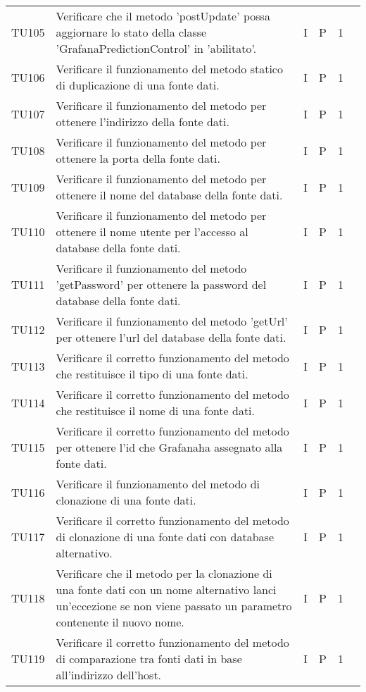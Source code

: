 \begin{longtable} {
		>{}p{12mm}
		>{}p{79.5mm}
		>{}p{9mm}
		>{}p{8mm}
		>{}p{14mm}
		>{}p{0mm}}
	TU105		& Verificare che il metodo 'postUpdate' possa aggiornare lo stato della classe 'GrafanaPredictionControl' in 'abilitato'.& I & P & 1 &\TBstrut \\ [2mm]
	TU106		& Verificare il funzionamento del metodo statico di duplicazione di una fonte dati.& I & P & 1 &\TBstrut \\ [2mm]
	TU107		& Verificare il funzionamento del metodo per ottenere l'indirizzo della fonte dati.& I & P & 1 &\TBstrut \\ [2mm]
	TU108		& Verificare il funzionamento del metodo per ottenere la porta della fonte dati.& I & P & 1 &\TBstrut \\ [2mm]
	TU109		& Verificare il funzionamento del metodo per ottenere il nome del database della fonte dati.& I & P & 1 &\TBstrut \\ [2mm]
	TU110		& Verificare il funzionamento del metodo per ottenere il nome utente per l'accesso al database della fonte dati.& I & P & 1 &\TBstrut \\ [2mm]
	TU111		& Verificare il funzionamento del metodo 'getPassword' per ottenere la password del database della fonte dati.& I & P & 1 &\TBstrut \\ [2mm]
	TU112		& Verificare il funzionamento del metodo 'getUrl' per ottenere l'url del database della fonte dati.& I & P & 1 &\TBstrut \\ [2mm]
	TU113		& Verificare il corretto funzionamento del metodo che restituisce il tipo di una fonte dati. & I & P & 1 &\TBstrut \\ [2mm]
	TU114		& Verificare il corretto funzionamento del metodo che restituisce il nome di una fonte dati. & I & P & 1 &\TBstrut \\ [2mm]
	TU115		& Verificare il corretto funzionamento del metodo per ottenere l'id che Grafana\glosp ha assegnato alla fonte dati. & I & P & 1 &\TBstrut \\ [2mm]
	TU116		& Verificare il funzionamento del metodo di clonazione di una fonte dati.& I & P & 1 &\TBstrut \\ [2mm]
	TU117		& Verificare il corretto funzionamento del metodo di clonazione di una fonte dati con database alternativo. & I & P & 1 &\TBstrut \\ [2mm]
	TU118		& Verificare che il metodo per la clonazione di una fonte dati con un nome alternativo lanci un'eccezione se non viene passato un parametro contenente il nuovo nome.& I & P & 1 &\TBstrut \\ [2mm]
	TU119		& Verificare il corretto funzionamento del metodo di comparazione tra fonti dati in base all'indirizzo dell'host. & I & P & 1 &\TBstrut \\ [2mm]

\end{longtable}
